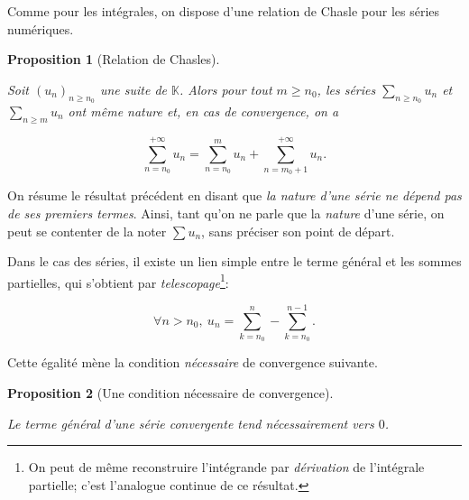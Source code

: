 \documentclass[
  french,
  letterpaper,
  DIV=11,
  numbers=noendperiod]{scrreprt}
\theoremstyle{plain}
\theoremstyle{definition}
\theoremstyle{plain}
\newtheorem{proposition}{Proposition}[chapter]
\theoremstyle{plain}
\theoremstyle{definition}
\theoremstyle{definition}
\theoremstyle{plain}
\theoremstyle{remark}
\newcounter{quartocalloutnteno}
\newcommand{\quartocalloutnte}[1]{\refstepcounter{quartocalloutnteno}\label{#1}}
\begin{document}
Comme pour les intégrales, on dispose d'une relation de Chasle pour les
séries numériques.

\begin{proposition}[Relation de
Chasles]\protect\hypertarget{prp-chasles}{}\label{prp-chasles}

Soit \((u_n)_{n\geqslant n_0}\) une suite de \(\mathbb{K}\). Alors pour
tout \(m\geqslant
n_0\), les séries \(\sum_{n\geqslant n_0}u_n\) et
\(\sum_{n\geqslant m}u_n\) ont \emph{même nature} et, en cas de
convergence, on a

\[
\sum_{n=n_0}^{+\infty} u_n = \sum_{n=n_0}^{m} u_n + \sum_{n=m_0+1}^{+\infty} u_n.
\]

\end{proposition}

\begin{tcolorbox}[enhanced jigsaw, arc=.35mm, bottomrule=.15mm, bottomtitle=1mm, breakable, colback=white, colbacktitle=quarto-callout-note-color!10!white, colframe=quarto-callout-note-color-frame, coltitle=black, left=2mm, leftrule=.75mm, opacityback=0, opacitybacktitle=0.6, rightrule=.15mm, title=\textcolor{quarto-callout-note-color}{\faInfo}\hspace{0.5em}{Note \ref*{nte-independance-premier-terme}}, titlerule=0mm, toprule=.15mm, toptitle=1mm]

\quartocalloutnte{nte-independance-premier-terme} 

On résume le résultat précédent en disant que \emph{la nature d'une
série ne dépend pas de ses premiers termes}. Ainsi, tant qu'on ne parle
que la \emph{nature} d'une série, on peut se contenter de la noter
\(\sum u_n\), sans préciser son point de départ.

\end{tcolorbox}

Dans le cas des séries, il existe un lien simple entre le terme général
et les sommes partielles, qui s'obtient par
\emph{telescopage}\footnote{On peut de même reconstruire l'intégrande
  par \emph{dérivation} de l'intégrale partielle; c'est l'analogue
  continue de ce résultat.}:

\[
    \forall n > n_{0},\ u_{n} = \sum_{k=n_{0}}^{n} - \sum_{k=n_{0}}^{n-1}.
\]

Cette égalité mène la condition \emph{nécessaire} de convergence
suivante.

\begin{proposition}[Une condition nécessaire de
convergence]\protect\hypertarget{prp-condition-necessaire}{}\label{prp-condition-necessaire}

Le terme général d'une série convergente tend nécessairement vers \(0\).

\end{proposition}
\end{document}
